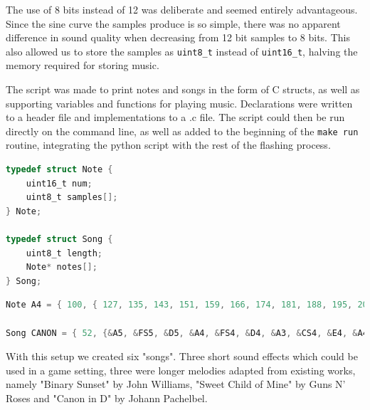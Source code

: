 The use of 8 bits instead of 12 was deliberate and seemed entirely advantageous. Since the sine curve the samples produce is so simple, there was no apparent difference in sound quality when decreasing from 12 bit samples to 8 bits. This also allowed us to store the samples as \texttt{uint8\_t} instead of \texttt{uint16\_t}, halving the memory required for storing music.

The script was made to print notes and songs in the form of C structs, as well as supporting variables and functions for playing music. Declarations were written to a header file and implementations to a .c file. The script could then be run directly on the command line, as well as added to the beginning of the \texttt{make run} routine, integrating the python script with the rest of the flashing process.

\begin{minipage}{\linewidth}
\begin{lstlisting}[language=C, label=structs, caption=Excerpt from music.h]
typedef struct Note {
    uint16_t num;
    uint8_t samples[];
} Note;

typedef struct Song {
    uint8_t length;
    Note* notes[];
} Song;
\end{lstlisting}
\end{minipage}

\begin{minipage}{\linewidth}
\begin{lstlisting}[language=C, label=note-song, caption=Excerpts from music.c]
Note A4 = { 100, { 127, 135, 143, 151, 159, 166, 174, 181, 188, 195, 202, 208, 214, 220, 225, 230, 234, 239, 242, 245, 248, 250, 252, 253, 254, 254, 254, 254, 252, 251, 248, 246, 243, 239, 235, 231, 226, 220, 215, 209, 203, 196, 189, 182, 175, 167, 160, 152, 144, 136, 128, 120, 112, 104, 96, 89, 81, 74, 67, 60, 53, 47, 41, 35, 30, 25, 20, 16, 12, 9, 6, 4, 2, 1, 0, 0, 0, 0, 2, 3, 5, 8, 11, 15, 19, 23, 28, 33, 39, 44, 51, 57, 64, 71, 78, 86, 94, 101, 109, 117 } };

Song CANON = { 52, {&A5, &FS5, &D5, &A4, &FS4, &D4, &A3, &CS4, &E4, &A4, &CS5, &E5, &FS5, &D5, &B4, &FS4, &D4, &B3, &FS3, &A3, &CS4, &FS4, &A4, &CS5, &D5, &B4, &G4, &D4, &B3, &G3, &D3, &FS3, &A3, &D4, &FS4, &A4, &B4, &G4, &D4, &B3, &G3, &D3, &A3, &CS4, &E4, &A4, &CS5, &E5, &A5, &A5, &A5, &A5} };
\end{lstlisting}
\end{minipage}

With this setup we created six "songs". Three short sound effects which could be used in a game setting, three were longer melodies adapted from existing works, namely "Binary Sunset" by John Williams, "Sweet Child of Mine" by Guns N' Roses and "Canon in D" by Johann Pachelbel.

